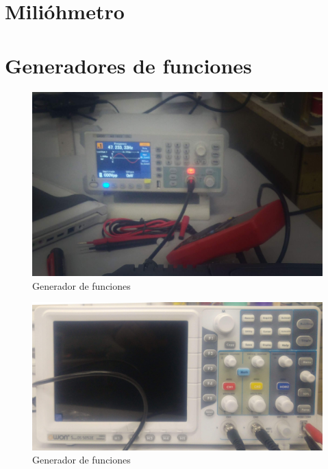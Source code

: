 \section{Milióhmetro}
\section{Generadores de funciones}

\begin{figure}[htbp]
  \centering
  \includegraphics[width=\textwidth,height=\textheight,keepaspectratio]{images/fotos/generadordefunciones1.jpg}
  \caption{Generador de funciones}
  \label{fig:generador_funciones_1}
\end{figure}

\begin{figure}[htbp]
  \centering
  \includegraphics[width=\textwidth,height=\textheight,keepaspectratio]{images/fotos/generadordefunciones2.jpg}
  \caption{Generador de funciones}
  \label{fig:generador_funciones_2}
\end{figure}

